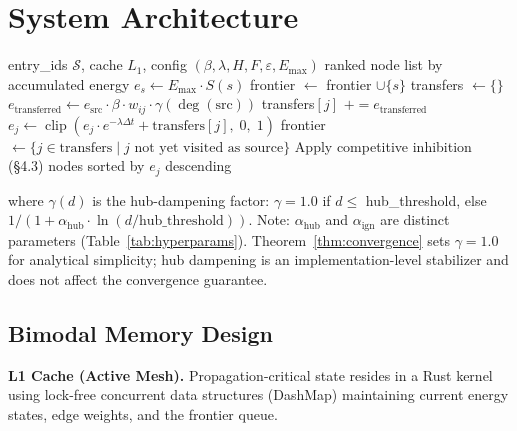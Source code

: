 \documentclass[11pt]{article}
\begin{document}
\section{System Architecture}

\begin{algorithm}[t]
\caption{AtomicPing BFS Propagation}
\label{alg:bfs}
\begin{algorithmic}[1]
\Require entry\_ids $\mathcal{S}$, cache $L_1$,
         config $(\beta, \lambda, H, F, \varepsilon, E_{\max})$
\Ensure ranked node list by accumulated energy
  \State $e_s \leftarrow E_{\max} \cdot S(s)$ 
  \State frontier $\leftarrow$ frontier $\cup \{s\}$
\EndFor
{}
  \State transfers $\leftarrow \{\}$
      \State $e_{\text{transferred}} \leftarrow e_{\text{src}} \cdot \beta \cdot w_{ij} \cdot \gamma(\deg(\text{src}))$
        \State transfers$[j]$ $+= e_{\text{transferred}}$
      \EndIf
    \EndFor
  \EndFor
    \State $e_j \leftarrow \operatorname{clip}(e_j \cdot e^{-\lambda\Delta t} + \text{transfers}[j],\; 0,\; 1)$
  \EndFor
  \State frontier $\leftarrow \{j \in \text{transfers} \mid j \text{ not yet visited as source}\}$
\EndFor
\State Apply competitive inhibition (\S4.3)
\State \Return nodes sorted by $e_j$ descending
\end{algorithmic}
\end{algorithm}

where $\gamma(d)$ is the hub-dampening factor:
$\gamma = 1.0$ if $d \le$ hub\_threshold, else
$1 / (1 + \alpha_{\text{hub}} \cdot \ln(d / \text{hub\_threshold}))$.
Note: $\alpha_{\text{hub}}$ and $\alpha_{\text{ign}}$ are distinct
parameters (Table~\ref{tab:hyperparams}). Theorem~\ref{thm:convergence}
sets $\gamma = 1.0$ for analytical simplicity; hub dampening is an
implementation-level stabilizer and does not affect the convergence
guarantee.

\subsection{Bimodal Memory Design}
\textbf{L1 Cache (Active Mesh).} Propagation-critical state resides in a
Rust kernel using lock-free concurrent data structures (DashMap)
maintaining current energy states, edge weights, and the frontier queue.
\end{document}
